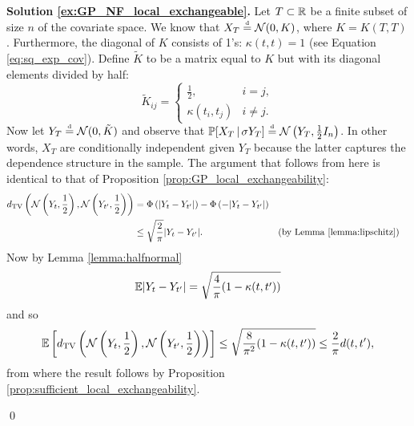 \textbf{Solution \ref{ex:GP_NF_local_exchangeable}. \hspace{0.05cm}} Let $T \subset \mathbb{R}$ be a finite subset of size $n$ of the covariate space. We know that $X_T \stackrel{\text{\rm\tiny d}}{=} \mathcal{N} (0, K)$, where $K = K(T,T)$. Furthermore, the diagonal of $K$ consists of 1's: $\kappa(t, t) = 1$ (see Equation \ref{eq:sq_exp_cov}). Define $\tilde{K}$ to be a matrix equal to $K$ but with its diagonal elements divided by half:
\begin{equation*}
	\tilde{K}_{ij} = \begin{cases}
					  	\frac{1}{2}, & i=j, \\
					  	\kappa(t_i, t_j) & i \neq j.
					  \end{cases}
\end{equation*}
Now let $Y_T \stackrel{\text{\rm\tiny d}}{=} \mathcal{N}(0, \tilde{K})$ and observe that $\mathbb{P} [ X_T \, | \, \sigma Y_T ] \stackrel{\text{\rm\tiny d}}{=} \mathcal{N} \left( Y_T, \frac{1}{2} I_n \right)$. In other words, $X_T$ are conditionally independent given $Y_T$ because the latter captures the dependence structure in the sample. The argument that follows from here is identical to that of Proposition \ref{prop:GP_local_exchangeability}:
\begin{align*}
	d_{\mathrm{TV}} \left( \mathcal{N} \left( Y_t, \frac{1}{2} \right) , \mathcal{N} \left( Y_{t'}, \frac{1}{2} \right) \right) &= \Phi \left( |Y_t - Y_{t'} | \right) - \Phi \left( -|Y_t - Y_{t'} | \right) \\
		&\leq \sqrt{\frac{2}{\pi}} |Y_t - Y_{t'}|. && \text{(by Lemma \ref{lemma:lipschitz})}
\end{align*}
Now by Lemma \ref{lemma:halfnormal}
\begin{equation*}
	\mathbb{E} | Y_t - Y_{t'} | = \sqrt{\frac{4}{\pi}(1 - \kappa(t, t'))}
\end{equation*}
and so
\begin{equation*}
	\mathbb{E} \left[ d_{\mathrm{TV}} \left( \mathcal{N} \left( Y_t, \frac{1}{2} \right) , \mathcal{N} \left( Y_{t'}, \frac{1}{2} \right) \right) \right] \leq \sqrt{\frac{8}{\pi^2}(1 - \kappa(t, t'))} \leq \frac{2}{\pi} d(t, t'),
\end{equation*}
from where the result follows by Proposition \ref{prop:sufficient_local_exchangeability}.

\qed 

